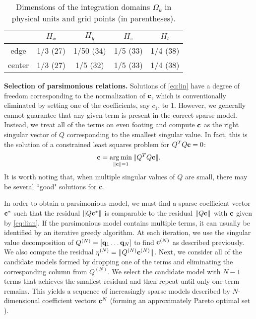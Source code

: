 \documentclass[
 reprint,
 amsmath,amssymb,
 aps,
]{revtex4-2}
\DeclareMathOperator*{\argmin}{arg\,min}
\begin{document}
\begin{table}
\begin{tabular}{*{5}{c}}
\hline & $H_x$ & $H_y$ & $H_z$ & $H_t$ \\ \hline
edge & 1/3 (27) & 1/50 (34) & 1/5 (33) & 1/4 (38) \\ 
center & 1/3 (27) & 1/5 (32) & 1/5 (33) & 1/4 (38) \\ \hline
\end{tabular}
\caption{Dimensions of the integration domains $\Omega_k$ in physical units and grid points (in parentheses).}
\label{tab:domain}
\end{table}

{\bf Selection of parsimonious relations.} Solutions of \eqref{eq:lin} have a degree of freedom corresponding to the normalization of ${\bf c}$, which is conventionally eliminated by setting one of the coefficients, say $c_1$, to 1. However, we generally cannot guarantee that any given term is present in the correct sparse model. Instead, we treat all of the terms on even footing and compute ${\bf c}$ as the right singular vector of $Q$ corresponding to the smallest singular value.
In fact, this is the solution of a constrained least squares problem for $Q^TQ{\bf c}=0$:
\begin{equation}
{\bf c}=\argmin_{\|{\bf c}\|=1}\|Q^TQ{\bf c}\|.
\label{eq:linn}
\end{equation}
It is worth noting that, when multiple singular values of $Q$ are small, there may be several ``good" solutions for ${\bf c}$. 

In order to obtain a parsimonious model, we must find a sparse coefficient vector ${\bf c}^*$ such that the residual $\|Q{\bf c}^*\|$ is comparable to the residual $\|Q{\bf c}\|$ with ${\bf c}$ given by \eqref{eq:linn}. If the parsimonious model contains multiple terms, it can usually be identified by an iterative greedy algorithm. At each iteration, we use the singular value decomposition of $Q^{(N)} = [{\bf q}_1 \dots {\bf q}_N]$ to find ${\bf c}^{(N)}$ as described previously. We also compute the residual $\eta^{(N)} = \|Q^{(N)} {\bf c}^{(N)}\|$. Next, we consider all of the candidate models formed by dropping one of the terms and eliminating the corresponding column from $Q^{(N)}$. We select the candidate model with $N-1$ terms that achieves the smallest residual and then repeat until only one term remains. This yields a sequence of increasingly sparse models described by $N$-dimensional coefficient vectors ${\bf c}^N$ (forming an approximately Pareto optimal set \cite{miettinen2012}).
\end{document}
